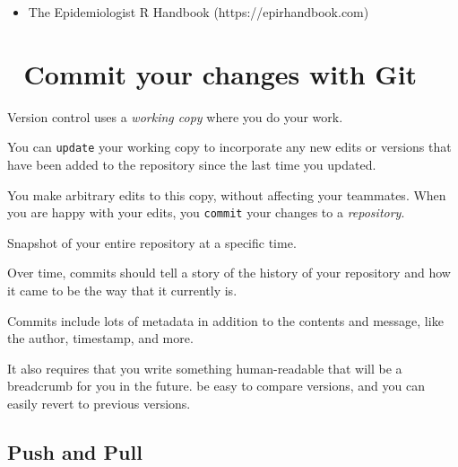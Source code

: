 \documentclass[
  letterpaper,
  DIV=11,
  numbers=noendperiod]{scrreprt}
\providecommand{\tightlist}{%
  \setlength{\itemsep}{0pt}\setlength{\parskip}{0pt}}\usepackage{longtable,booktabs,array}
\begin{document}
\begin{itemize}
\tightlist
\item
  The Epidemiologist R Handbook (https://epirhandbook.com)
\end{itemize}

\hypertarget{commit-your-changes-with-git}{%
\chapter{\texorpdfstring{{📘} Commit your changes with
Git}{📘 Commit your changes with Git}}\label{commit-your-changes-with-git}}

Version control uses a \emph{working copy} where you do your work.

\begin{tcolorbox}[enhanced jigsaw, colframe=quarto-callout-note-color-frame, colback=white, rightrule=.15mm, bottomrule=.15mm, left=2mm, arc=.35mm, coltitle=black, title=\textcolor{quarto-callout-note-color}{\faInfo}\hspace{0.5em}{Note}, opacitybacktitle=0.6, bottomtitle=1mm, opacityback=0, toptitle=1mm, toprule=.15mm, colbacktitle=quarto-callout-note-color!10!white, titlerule=0mm, leftrule=.75mm, breakable]
You can \texttt{update} your working copy to incorporate any new edits
or versions that have been added to the repository since the last time
you updated.
\end{tcolorbox}

You make arbitrary edits to this copy, without affecting your teammates.
When you are happy with your edits, you \texttt{commit} your changes to
a \emph{repository}.

Snapshot of your entire repository at a specific time.

Over time, commits should tell a story of the history of your repository
and how it came to be the way that it currently is.

Commits include lots of metadata in addition to the contents and
message, like the author, timestamp, and more.

It also requires that you write something human-readable that will be a
breadcrumb for you in the future. be easy to compare versions, and you
can easily revert to previous versions.

\hypertarget{push-and-pull}{%
\section{Push and Pull}\label{push-and-pull}}
\end{document}
